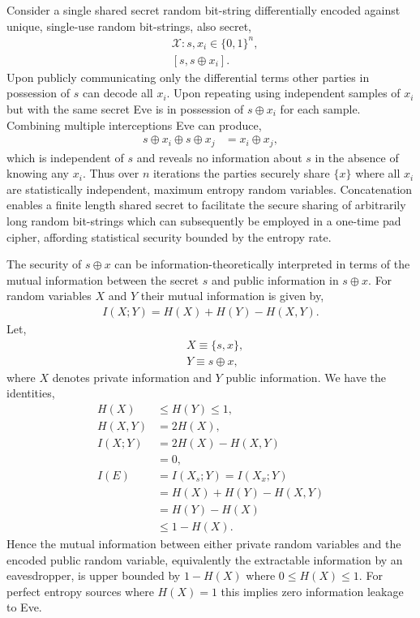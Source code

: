 \documentclass[twocolumn, aps, amsmath, amssymb, nofootinbib, superscriptaddress, longbibliography, doublefloatfix, table-of-contents, eqsecnum, rmp]{revtex4-2}
\begin{document}
Consider a single shared secret random bit-string differentially encoded against unique, single-use random bit-strings, also secret,
\begin{align}
	&\mathcal{X}: s,x_i \in \{0,1\}^n,\nonumber\\
	&[s,s\oplus x_i].
\end{align}
Upon publicly communicating only the differential terms other parties in possession of $s$ can decode all $x_i$. Upon repeating using independent samples of $x_i$ but with the same secret Eve is in possession of $s\oplus x_i$ for each sample. Combining multiple interceptions Eve can produce,
\begin{align}
	s\oplus x_i \oplus s \oplus x_j &= x_i \oplus x_j,
\end{align}
which is independent of $s$ and reveals no information about $s$ in the absence of knowing any $x_i$. Thus over $n$ iterations the parties securely share $\{x\}$ where all $x_i$ are statistically independent, maximum entropy random variables. Concatenation enables a finite length shared secret to facilitate the secure sharing of arbitrarily long random bit-strings which can subsequently be employed in a one-time pad cipher, affording statistical security bounded by the entropy rate.

The security of $s\oplus x$ can be information-theoretically interpreted in terms of the mutual information between the secret $s$ and public information in $s\oplus x$. For random variables $X$ and $Y$ their mutual information is given by,
\begin{align}
	I(X;Y) = H(X) + H(Y) - H(X,Y).	
\end{align}
Let,
\begin{align}
 	&X\equiv \{s,x\},\nonumber\\
 	&Y\equiv s\oplus x,
\end{align} 
where $X$ denotes private information and $Y$ public information. We have the identities,
\begin{align}
 	H(X) &\leq H(Y) \leq 1,\nonumber\\
	H(X,Y) &= 2H(X),\nonumber\\
	I(X;Y) &= 2H(X)-H(X,Y)\nonumber\\
	&= 0,\nonumber\\
	I(E) &= I(X_s;Y) = I(X_x;Y)\nonumber\\
	&= H(X)+H(Y)-H(X,Y)\nonumber\\
	&= H(Y) - H(X)\nonumber\\
	&\leq 1-H(X).
\end{align}
Hence the mutual information between either private random variables and the encoded public random variable, equivalently the extractable information by an eavesdropper, is upper bounded by $1-H(X)$ where $0\leq H(X)\leq 1$. For perfect entropy sources where $H(X)=1$ this implies zero information leakage to Eve.
\end{document}
